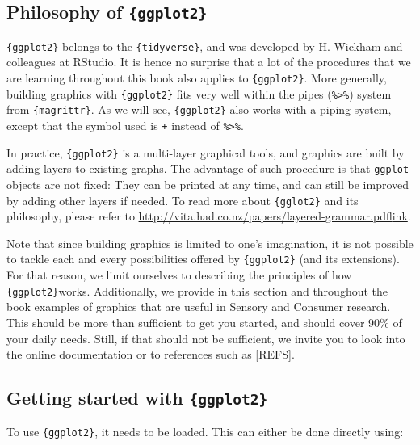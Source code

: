 \documentclass[
]{book}
\begin{document}
\hypertarget{philosophy-of-ggplot2}{%
\subsection{\texorpdfstring{Philosophy of \texttt{\{ggplot2\}}}{Philosophy of \{ggplot2\}}}\label{philosophy-of-ggplot2}}

\texttt{\{ggplot2\}} belongs to the \texttt{\{tidyverse\}}, and was developed by H. Wickham and colleagues at RStudio. It is hence no surprise that a lot of the procedures that we are learning throughout this book also applies to \texttt{\{ggplot2\}}. More generally, building graphics with \texttt{\{ggplot2\}} fits very well within the pipes (\texttt{\%\textgreater{}\%}) system from \texttt{\{magrittr\}}. As we will see, \texttt{\{ggplot2\}} also works with a piping system, except that the symbol used is \texttt{+} instead of \texttt{\%\textgreater{}\%}.

In practice, \texttt{\{ggplot2\}} is a multi-layer graphical tools, and graphics are built by adding layers to existing graphs. The advantage of such procedure is that \texttt{ggplot} objects are not fixed: They can be printed at any time, and can still be improved by adding other layers if needed. To read more about \texttt{\{gglot2\}} and its philosophy, please refer to \url{http://vita.had.co.nz/papers/layered-grammar.pdf}\href{http://vita.had.co.nz/papers/layered-grammar.pdf}{link}.

Note that since building graphics is limited to one's imagination, it is not possible to tackle each and every possibilities offered by \texttt{\{ggplot2\}} (and its extensions). For that reason, we limit ourselves to describing the principles of how \texttt{\{ggplot2\}}works. Additionally, we provide in this section and throughout the book examples of graphics that are useful in Sensory and Consumer research. This should be more than sufficient to get you started, and should cover 90\% of your daily needs. Still, if that should not be sufficient, we invite you to look into the online documentation or to references such as {[}REFS{]}.

\hypertarget{getting-started-with-ggplot2}{%
\subsection{\texorpdfstring{Getting started with \texttt{\{ggplot2\}}}{Getting started with \{ggplot2\}}}\label{getting-started-with-ggplot2}}

To use \texttt{\{ggplot2\}}, it needs to be loaded. This can either be done directly using:
\end{document}
